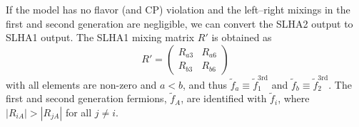 \documentclass[a4paper,11pt,captions=tableheading,DIV=12]{scrartcl}
\begin{document}
If the model has no flavor (and CP) violation and the left--right mixings in the first and second generation are negligible, we can convert the SLHA2 output to SLHA1 output.
The SLHA1 mixing matrix $R'$ is obtained as
\begin{equation}
R' = \begin{pmatrix}
  R_{a3} & R_{a6}\\
  R_{b3} & R_{b6}
\end{pmatrix}
\end{equation}
with all elements are non-zero and $a<b$, and thus $\tilde f_a\equiv\tilde f^{\text{3rd}}_1$
and  $\tilde f_b\equiv\tilde f^{\text{3rd}}_2$.
The first and second generation fermions, $\tilde f_A$, are identified with $\tilde f_i$, where $|R_{iA}|>|R_{jA}|$ for all $j\neq i$.

\end{document}

